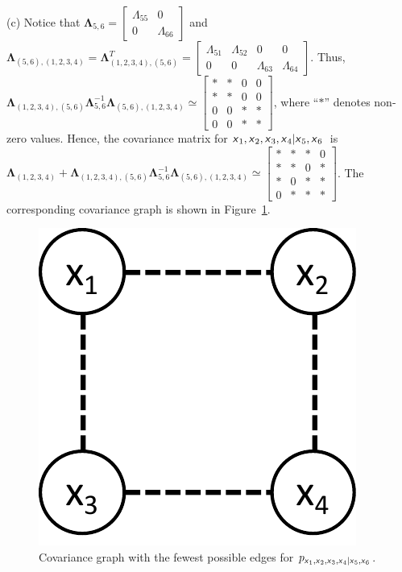 \documentclass{article}
\newcommand{\s}[1]{\textsf{\textit{#1}}}
\newcommand{\bm}{\mathbf}
\begin{document}
\noindent
(c) Notice that $\bm{\Lambda}_{5,6} =
\begin{bmatrix}
    \Lambda_{55} & 0 \\
    0 & \Lambda_{66}
\end{bmatrix}$
%
and
%
$\bm{\Lambda}_{(5,6), (1,2,3,4)} = \bm{\Lambda}_{(1,2,3,4), (5,6)}^T =
\begin{bmatrix}
    \Lambda_{51} & \Lambda_{52} & 0 & 0 \\
    0 & 0 & \Lambda_{63} & \Lambda_{64}
\end{bmatrix}$. Thus, 
$\bm{\Lambda}_{(1,2,3,4), (5,6)}\bm{\Lambda}_{5,6}^{-1} \bm{\Lambda}_{(5,6), (1,2,3,4)}
\simeq
\begin{bmatrix}
    * & * & 0 & 0 \\
    * & * & 0 & 0 \\
    0 & 0 & * & * \\
    0 & 0 & * & *
\end{bmatrix}$,
where ``$*$'' denotes non-zero values. Hence, the covariance matrix for
$\s{x}_1, \s{x}_2, \s{x}_3, \s{x}_4 | \s{x}_5, \s{x}_6$ \,is\;
$\bm{\Lambda}_{(1,2,3,4)} + \bm{\Lambda}_{(1,2,3,4), (5,6)}\bm{\Lambda}_{5,6}^{-1} \bm{\Lambda}_{(5,6), (1,2,3,4)}
\simeq
\begin{bmatrix}
    * & * & * & 0 \\
    * & * & 0 & * \\
    * & 0 & * & * \\
    0 & * & * & *
\end{bmatrix}$.
The corresponding covariance graph is shown in Figure~\ref{f:1c}.
\begin{figure}[h]
  \centering
  \includegraphics[width=0.2\columnwidth]{1c.pdf}
    \vspace{-0.1cm}
  \caption{Covariance graph with the fewest possible edges for
  $p_{\s{x}_1, \s{x}_2, \s{x}_3, \s{x}_4|\s{x}_5, \s{x}_6}$.}
  \label{f:1c}
\end{figure}
\pagebreak

\end{document}
